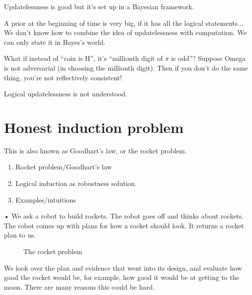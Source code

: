 \documentclass[11pt]{article}
\begin{document}
Updatelessness is good but it's set up in a Bayesian framework.

A prior at the beginning of time is very big, if it has all the logical statements... We don't know how to combine the idea of updatelessness with computation. We can only state it in Bayes's world.



What if instead of ``coin is H'', it's ``millionth digit of $\pi$ is odd''? Suppose Omega is not adversarial (in choosing the millionth digit). Then if you don't do the same thing, you're not reflectively consistent!

Logical updatelessness is not understood. 


\section{Honest induction problem}

This is also known as Goodhart's law, or the rocket problem.

\begin{enumerate}
\item
Rocket problem/Goodhart's law
\item
Logical induction as robustness solution.
\item
Examples/intuitions
\end{enumerate}•
We ask a robot to build rockets. The robot goes off and thinks about rockets. The robot comes up with plans for how a rocket should look. It returns a rocket plan to us.

\begin{figure}[h!]
\caption{The rocket problem}
\end{figure}

We look over the plan and evidence that went into its design, and evaluate how good the rocket would be, for example, how good it would be at getting to the moon. 
There are many reasons this could be hard.
\end{document}
